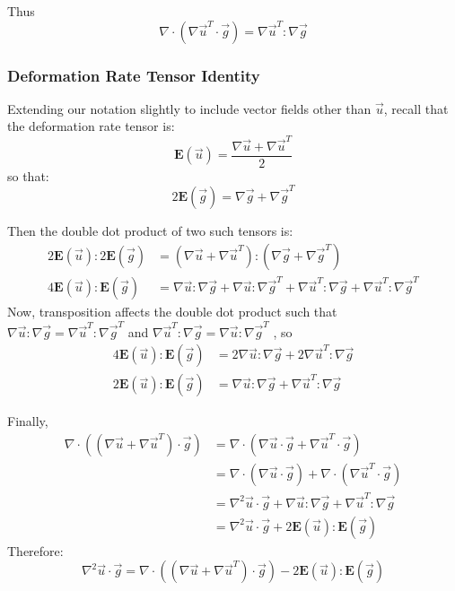 \documentclass[a4paper]{report}
\begin{document}
Thus
\begin{equation*}
\nabla \cdot (\nabla \vec{u}^T \cdot \vec{g}) = \nabla \vec{u}^T:\nabla \vec{g}
\end{equation*}

\subsubsection*{Deformation Rate Tensor Identity}

Extending our notation slightly to include vector fields other than $\vec{u}$, recall that the deformation rate tensor is:
\begin{equation*}
\mathbf{E}(\vec{u}) = \frac{\nabla \vec{u} + \nabla \vec{u}^T }{2}
\end{equation*}
so that:
\begin{equation*}
2 \mathbf{E}(\vec{g}) = \nabla \vec{g} + \nabla \vec{g}^T
\end{equation*}

Then the double dot product of two such tensors is:
\begin{align*}
2 \mathbf{E}(\vec{u}):2 \mathbf{E}(\vec{g}) & =
(\nabla \vec{u} + \nabla \vec{u}^T ):(\nabla \vec{g} + \nabla \vec{g}^T ) \\
4 \mathbf{E}(\vec{u}): \mathbf{E}(\vec{g}) & =
   \nabla \vec{u}:\nabla \vec{g} + \nabla \vec{u}:\nabla \vec{g}^T
 + \nabla \vec{u}^T:\nabla \vec{g} + \nabla \vec{u}^T: \nabla \vec{g}^T
\end{align*}
Now, transposition affects the double dot product such that \\
 $\nabla \vec{u}:\nabla \vec{g} =\nabla \vec{u}^T: \nabla \vec{g}^T$ 
 and $ \nabla \vec{u}^T:\nabla \vec{g} = \nabla \vec{u}:\nabla \vec{g}^T $ , so
\begin{align*}
4 \mathbf{E}(\vec{u}): \mathbf{E}(\vec{g}) & =
   2 \nabla \vec{u}:\nabla \vec{g} + 2 \nabla \vec{u}^T:\nabla \vec{g} \\
2 \mathbf{E}(\vec{u}): \mathbf{E}(\vec{g}) & =
   \nabla \vec{u}:\nabla \vec{g} + \nabla \vec{u}^T:\nabla \vec{g}   
\end{align*}

\vspace{1em}
Finally,
\begin{align*}
\nabla \cdot ( (\nabla \vec{u} + \nabla \vec{u}^T) \cdot \vec{g}) & =
\nabla \cdot ( \nabla \vec{u} \cdot \vec{g} + \nabla \vec{u}^T \cdot \vec{g}) \\
  & = \nabla \cdot ( \nabla \vec{u} \cdot \vec{g}) +
      \nabla \cdot ( \nabla \vec{u}^T \cdot \vec{g}) \\
  & = \nabla^2 \vec{u} \cdot \vec{g} + \nabla \vec{u}:\nabla \vec{g}
      + \nabla \vec{u}^T:\nabla \vec{g} \\
  & = \nabla^2 \vec{u} \cdot \vec{g} + 2 \mathbf{E}(\vec{u}):\mathbf{E}(\vec{g})
\end{align*}
Therefore:
\begin{equation*}
\nabla^2 \vec{u} \cdot \vec{g} = 
\nabla \cdot ( (\nabla \vec{u} + \nabla \vec{u}^T) \cdot \vec{g})
- 2 \mathbf{E}(\vec{u}):\mathbf{E}(\vec{g})
\end{equation*}
\end{document}
